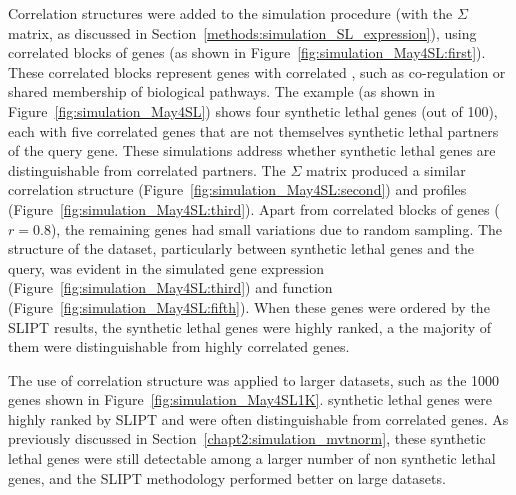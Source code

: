 Correlation structures were added to the simulation procedure (with the $\Sigma$ matrix, as discussed in Section~\ref{methods:simulation_SL_expression}), using correlated blocks of genes (as shown in Figure~\ref{fig:simulation_May4SL:first}). These correlated blocks represent genes with correlated , such as co-regulation or shared membership of biological pathways. The example (as shown in Figure~\ref{fig:simulation_May4SL}) shows four \gls{synthetic lethal} genes (out of 100), each with five correlated genes that are not themselves \gls{synthetic lethal} partners of the query gene. These simulations address whether \gls{synthetic lethal} genes are distinguishable from correlated partners. The $\Sigma$ matrix produced a similar correlation structure (Figure~\ref{fig:simulation_May4SL:second}) and  profiles (Figure~\ref{fig:simulation_May4SL:third}).  Apart from correlated blocks of genes ($r = 0.8$), the remaining genes had small variations due to random sampling. The structure of the dataset, particularly between \gls{synthetic lethal} genes and the query, was evident in the simulated \gls{gene expression} (Figure~\ref{fig:simulation_May4SL:third}) and function (Figure~\ref{fig:simulation_May4SL:fifth}). When these genes were ordered by the \gls{SLIPT} results, the \gls{synthetic lethal} genes were highly ranked, a the majority of them were distinguishable from highly correlated genes.

The use of correlation structure was applied to larger datasets, such as the 1000 genes shown in Figure~\ref{fig:simulation_May4SL1K}. \Gls{synthetic lethal} genes were highly ranked by \gls{SLIPT} and were often distinguishable from correlated genes. As previously discussed in Section~\ref{chapt2:simulation_mvtnorm}, these \gls{synthetic lethal} genes were still detectable among a larger number of non synthetic lethal genes, and the \gls{SLIPT} methodology performed better on large datasets.


